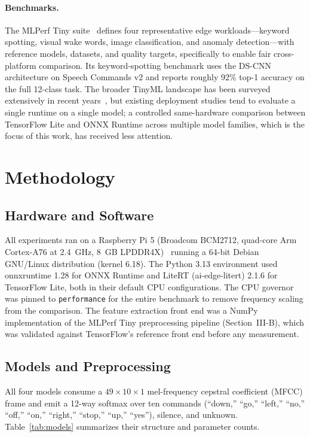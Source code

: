 \documentclass[conference,a4paper]{IEEEtran}
\begin{document}
\paragraph{Benchmarks.}
The MLPerf Tiny suite~\cite{banbury2021mlperftiny} defines four representative edge workloads---keyword spotting, visual wake words, image classification, and anomaly detection---with reference models, datasets, and quality targets, specifically to enable fair cross-platform comparison. Its keyword-spotting benchmark uses the DS-CNN architecture on Speech Commands v2 and reports roughly 92\% top-1 accuracy on the full 12-class task. The broader TinyML landscape has been surveyed extensively in recent years~\cite{rajapakse2023tinyml,capogrosso2023tinymlsurvey,kallimani2023tinyml}, but existing deployment studies tend to evaluate a single runtime on a single model; a controlled same-hardware comparison between TensorFlow Lite and ONNX Runtime across multiple model families, which is the focus of this work, has received less attention.

\section{Methodology}

\subsection{Hardware and Software}

All experiments ran on a Raspberry Pi 5 (Broadcom BCM2712, quad-core Arm Cortex-A76 at 2.4~GHz, 8~GB LPDDR4X)~\cite{raspberrypi5} running a 64-bit Debian GNU/Linux distribution (kernel 6.18). The Python 3.13 environment used onnxruntime 1.28 for ONNX Runtime and LiteRT (ai-edge-litert) 2.1.6 for TensorFlow Lite, both in their default CPU configurations. The CPU governor was pinned to \texttt{performance} for the entire benchmark to remove frequency scaling from the comparison. The feature extraction front end was a NumPy implementation of the MLPerf Tiny preprocessing pipeline (Section~III-B), which was validated against TensorFlow's reference front end before any measurement.

\subsection{Models and Preprocessing}

All four models consume a $49 \times 10 \times 1$ mel-frequency cepstral coefficient (MFCC) frame and emit a 12-way softmax over ten commands (``down,'' ``go,'' ``left,'' ``no,'' ``off,'' ``on,'' ``right,'' ``stop,'' ``up,'' ``yes''), silence, and unknown. Table~\ref{tab:models} summarizes their structure and parameter counts.
\end{document}
